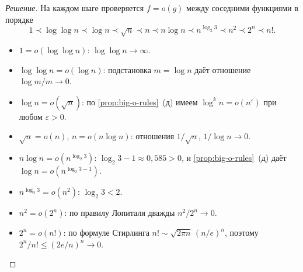 \begin{proof}[Решение]
На каждом шаге проверяется $f = o(g)$ между соседними функциями в
порядке
\[
  1 \prec \log\log n \prec \log n \prec \sqrt n \prec n \prec n \log n
    \prec n^{\log_2 3} \prec n^2 \prec 2^n \prec n!.
\]
\begin{itemize}
  \item $1 = o(\log\log n)$: $\log\log n \to \infty$.
  \item $\log\log n = o(\log n)$: подстановка $m = \log n$ даёт
        отношение $\log m / m \to 0$.
  \item $\log n = o(\sqrt n)$: по
        \cref{prop:big-o-rules}~(д) имеем
        $\log^k n = o(n^\varepsilon)$ при любом $\varepsilon > 0$.
  \item $\sqrt n = o(n)$, $n = o(n \log n)$: отношения $1/\sqrt n$,
        $1/\log n \to 0$.
  \item $n \log n = o(n^{\log_2 3})$: $\log_2 3 - 1 \approx 0{,}585 > 0$,
        и \cref{prop:big-o-rules}~(д) даёт
        $\log n = o(n^{\log_2 3 - 1})$.
  \item $n^{\log_2 3} = o(n^2)$: $\log_2 3 < 2$.
  \item $n^2 = o(2^n)$: по правилу Лопиталя дважды $n^2 / 2^n \to 0$.
  \item $2^n = o(n!)$: по формуле Стирлинга $n! \sim \sqrt{2\pi n}\,(n/e)^n$,
        поэтому $2^n / n! \le (2 e / n)^n \to 0$.
\end{itemize}
\end{proof}
